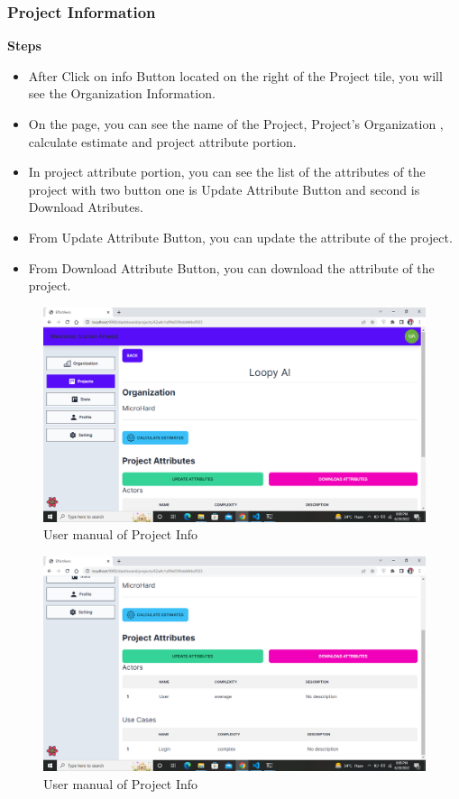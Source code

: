 \subsubsection{Project Information}
\textbf{Steps}
\begin{itemize}
    \item After Click on info Button located on the right of the Project tile, you will see the Organization Information.
    \item On the page, you can see the name of the Project, Project's Organization , calculate estimate and project attribute portion.
    \item In project attribute portion, you can see the list of the attributes of the project with two button one is Update Attribute Button and second is Download Atributes.
    \item From Update Attribute Button, you can update the attribute of the project.
    \item From Download Attribute Button, you can download the attribute of the project.

\end{itemize}

\begin{figure}[H]
    \centering
    \includegraphics[scale=0.4]{./diagrams/user-manual/Screenshot (30).png}
    \caption{User manual of Project Info}
    \label{fig:user-1}

\end{figure}

\begin{figure}[H]
    \centering
    \includegraphics[scale=0.4]{./diagrams/user-manual/Screenshot (31).png}
    \caption{User manual of Project Info}
    \label{fig:user-1}

\end{figure}

